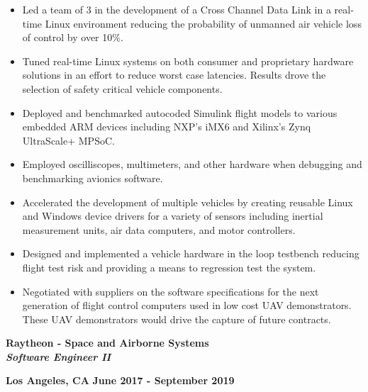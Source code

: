 \documentclass[11pt,letterpaper]{article}
\begin{document}
\begin{itemize}[noitemsep,topsep=0pt]
	\setlength\itemsep{0.2em}
	\item Led a team of 3 in the development of a Cross Channel Data Link in
	      a real-time Linux environment reducing the probability of unmanned
	      air vehicle loss of control by over 10\%.
	\item Tuned real-time Linux systems on both consumer and proprietary
	      hardware solutions in an effort to reduce worst case latencies.
	      Results drove the selection of safety critical vehicle components.
	\item Deployed and benchmarked autocoded Simulink flight models to
	      various embedded ARM devices including NXP's iMX6 and Xilinx's Zynq
	      UltraScale+ MPSoC.
	\item Employed oscilliscopes, multimeters, and other hardware when
	      debugging and benchmarking avionics software.
	\item Accelerated the development of multiple vehicles by creating
	      reusable Linux and Windows device drivers for a variety of sensors
	      including inertial measurement units, air data computers, and motor
	      controllers.
	\item Designed and implemented a vehicle hardware in the loop testbench
	      reducing flight test risk and providing a means to regression
	      test the system.
	\item Negotiated with suppliers on the software specifications for the next
	      generation of flight control computers used in low cost UAV
	      demonstrators. These UAV demonstrators would drive the capture of
	      future contracts.
\end{itemize}

\medskip

\begin{minipage}[t]{0.53\textwidth}
	\begin{flushleft}
		\textbf{Raytheon - Space and Airborne Systems}\\
		\textbf{\textit{Software Engineer II}}\\
	\end{flushleft}
\end{minipage}
\begin{minipage}[t]{0.43\textwidth}
	\begin{flushright}
    \textbf{Los Angeles, CA} \textbar \space
		\textbf{June 2017 - September 2019}
	\end{flushright}
\end{minipage}
\end{document}

